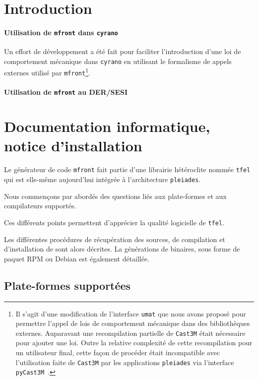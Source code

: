 \documentclass[rectoverso,pleiades,pstricks,leqno,anti]{texmf/note_technique_2010}
\newcommand{\pleiades}{\texttt{pleiades}}
\newcommand{\TFEL}{\texttt{tfel}}
\newcommand{\mfront}{\texttt{mfront}}
\newcommand{\cyrano}{\texttt{cyrano}}
\newcommand{\castem}{\texttt{Cast3M}}
\newcommand{\pycastem}{\texttt{pyCast3M}}
\newcommand{\umat}{\texttt{umat}}
\newcommand{\tfel}[1]{\index{tfel}{#1}{\texttt{#1}}}
\begin{document}
\clearpage
\newpage
\section{Introduction}

\paragraph{Utilisation de \mfront{} dans \cyrano{}}

Un effort de développement a été fait pour faciliter l'introduction
d'une loi de comportement mécanique dans \cyrano{} en utilisant le
formalisme de appels externes utilisé par \mfront{}\footnote{Il s'agit
d'une modification de l'interface \umat{} que nous avons proposé pour
permettre l'appel de lois de comportement mécanique dans des
bibliothèques externes. Auparavant une recompilation partielle de
\castem{} était nécessaire pour ajouter une loi. Outre la relative
complexité de cette recompilation pour un utilisateur final, cette façon
de procéder était incompatible avec l'utilisation faite de \castem{} par
les applications \pleiades{} via l'interface
\pycastem~\cite{t.06:_implan}.}.

\paragraph{Utilisation de \mfront{} au DER/SESI}

\clearpage
\newpage
\section{Documentation informatique, notice d'installation}

Le générateur de code \mfront{} fait partie d'une librairie
hétéroclite nommée \TFEL{} qui est elle-même aujourd'hui intégrée à
l'architecture \pleiades{}.

Nous commençons par abordés des questions liés aux plate-formes et aux
compilateurs supportés.

Ces différents points permettent d'apprécier la qualité logicielle de
\TFEL{}.

Les différentes procédures de récupération des sources, de compilation
et d'installation de \tfel{} sont alors décrites. La générations de
binaires, sous forme de paquet RPM ou Debian est également détaillée.

\subsection{Plate-formes supportées}
\end{document}
